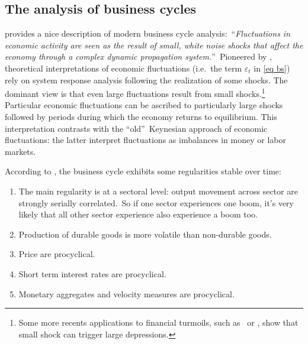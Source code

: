 \documentclass[a4paper,12pt]{article}%
\begin{document}
%


\subsection{The analysis of business cycles}

\cite{blanchard1986business} provides a nice description of modern business
cycle analysis:\ \textquotedblleft\textit{Fluctuations in economic activity
are seen as the result of small, white noise shocks that affect the economy
through a complex dynamic propagation system.}\textquotedblright\ Pioneered by
\cite{frisch1933propagation}, theoretical interpretations of economic
fluctuations (i.e.\ the term $\varepsilon_{t}$ in \autoref{eq bs}) rely on
system response analysis following the realization of some shocks. The
dominant view is that even large fluctuations result from small
shocks.\footnote{Some more recents applications to financial turmoils, such
as\ \cite{kiyotaki1997credit} or \cite{boissay2016booms}, show that small
shock can trigger large depressions.} Particular economic fluctuations can be
ascribed to particularly large shocks followed by periods during which the
economy returns to equilibrium. This interpretation contrasts with the
\textquotedblleft old\textquotedblright\ Keynesian approach of economic
fluctuations: the latter interpret fluctuations as imbalances in money or
labor markets.

According to \cite{lucas1977understanding}, the business cycle exhibits some
regularities stable over time:

\begin{enumerate}
\item The main regularity is at a sectoral level: output movement across
sector are strongly serially correlated.\ So if one sector experiences one
boom, it's very likely that all other sector experience also experience a boom too.

\item Production of durable goods is more volatile than non-durable goods.

\item Price are procyclical.

\item Short term interest rates are procyclical.

\item Monetary aggregates and velocity measures are procyclical.
\end{enumerate}
\end{document}
